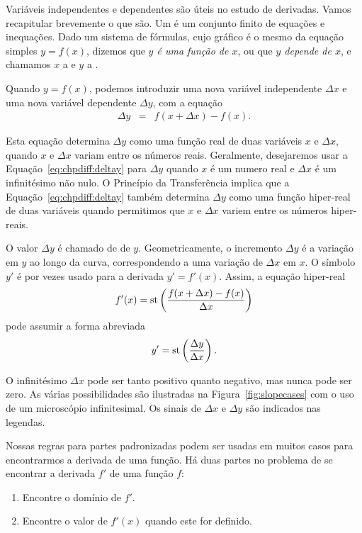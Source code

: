 Variáveis independentes e dependentes são úteis no estudo de derivadas.
Vamos recapitular brevemente o que são. Um 
é um conjunto finito de equações e inequações. Dado um sistema de fórmulas,
cujo gráfico é o mesmo da equação simples $y = f(x)$, dizemos que
\emph{$y$ é uma função de $x$}, ou que \emph{$y$ depende de $x$}, e chamamos
$x$ a  e $y$ a
.

Quando $y = f(x)$, podemos introduzir uma nova variável independente
$\Delta{x}$ e uma nova variável dependente $\Delta{y}$, com a equação
\begin{eqnarray}
  \Delta{y} & = & f(x+\Delta{x}) - f(x). \label{eq:chpdiff:deltay}
\end{eqnarray}

Esta equação determina $\Delta{y}$ como uma função real de duas variáveis
$x$ e $\Delta{x}$, quando $x$ e $\Delta{x}$ variam entre os números reais.
Geralmente, desejaremos usar a Equação~\ref{eq:chpdiff:deltay} para
$\Delta{y}$ quando $x$ é um numero real e $\Delta{x}$ é um infinitésimo
não nulo. O Princípio da Transferência implica que a
Equação~\ref{eq:chpdiff:deltay} também determina $\Delta{y}$ como uma
função hiper-real de duas variáveis quando permitimos que $x$ e $\Delta{x}$
variem entre os números hiper-reais.

O valor $\Delta{y}$ é chamado de  de $y$. Geometricamente,
o incremento $\Delta{y}$ é a variação em $y$ ao longo da curva, correspondendo
a uma variação de $\Delta{x}$ em $x$. O símbolo $y'$ é por vezes usado para
a derivada $y' = f'(x)$. Assim, a equação hiper-real
$$
  f'(x) = \operatorname{st}\left(\frac{f(x+\Delta{x})-f(x)}{\Delta{x}}\right)
$$
pode assumir a forma abreviada
$$
  y' = \operatorname{st}\left(\frac{\Delta{y}}{\Delta{x}}\right).
$$

O infinitésimo $\Delta{x}$ pode ser tanto positivo quanto negativo, mas
nunca pode ser zero. As várias possibilidades são ilustradas na
Figura~\ref{fig:slopecases} com o uso de um microscópio infinitesimal.
Os sinais de $\Delta{x}$ e $\Delta{y}$ são indicados nas legendas.


Nossas regras para partes padronizadas podem ser usadas em muitos casos
para encontrarmos a derivada de uma função. Há duas partes no problema de
se encontrar a derivada $f'$ de uma função $f$:
\begin{enumerate}[(1)]
\item Encontre o domínio de $f'$.
\item Encontre o valor de $f'(x)$ quando este for definido.
\end{enumerate}

